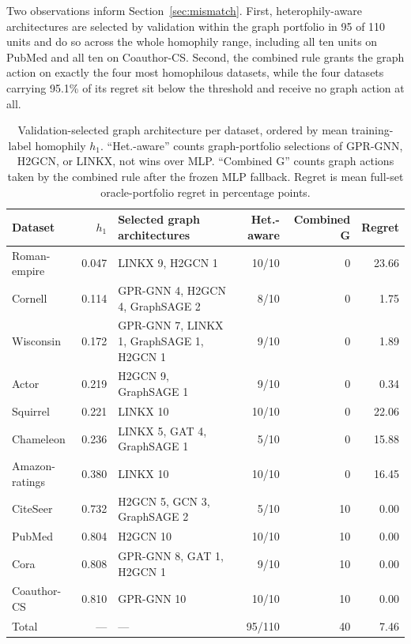 Two observations inform Section~\ref{sec:mismatch}. First, heterophily-aware architectures are selected by validation within the graph portfolio in 95 of 110 units and do so across the whole homophily range, including all ten units on PubMed and all ten on Coauthor-CS. Second, the combined rule grants the graph action on exactly the four most homophilous datasets, while the four datasets carrying 95.1\% of its regret sit below the threshold and receive no graph action at all.

\begin{table}[ht]
\centering
\caption{Validation-selected graph architecture per dataset, ordered by mean training-label homophily $h_1$. ``Het.-aware'' counts graph-portfolio selections of GPR-GNN, H2GCN, or LINKX, not wins over MLP. ``Combined G'' counts graph actions taken by the combined rule after the frozen MLP fallback. Regret is mean full-set oracle-portfolio regret in percentage points.}
\label{tab:winning_architectures}
\scriptsize
\setlength{\tabcolsep}{3.0pt}
\begin{tabular}{@{}lrlrrr@{}}
\toprule
Dataset & $h_1$ & Selected graph architectures & Het.-aware & Combined G & Regret \\
\midrule
Roman-empire & 0.047 & LINKX 9, H2GCN 1 & 10/10 & 0 & 23.66 \\
Cornell & 0.114 & GPR-GNN 4, H2GCN 4, GraphSAGE 2 & 8/10 & 0 & 1.75 \\
Wisconsin & 0.172 & GPR-GNN 7, LINKX 1, GraphSAGE 1, H2GCN 1 & 9/10 & 0 & 1.89 \\
Actor & 0.219 & H2GCN 9, GraphSAGE 1 & 9/10 & 0 & 0.34 \\
Squirrel & 0.221 & LINKX 10 & 10/10 & 0 & 22.06 \\
Chameleon & 0.236 & LINKX 5, GAT 4, GraphSAGE 1 & 5/10 & 0 & 15.88 \\
Amazon-ratings & 0.380 & LINKX 10 & 10/10 & 0 & 16.45 \\
CiteSeer & 0.732 & H2GCN 5, GCN 3, GraphSAGE 2 & 5/10 & 10 & 0.00 \\
PubMed & 0.804 & H2GCN 10 & 10/10 & 10 & 0.00 \\
Cora & 0.808 & GPR-GNN 8, GAT 1, H2GCN 1 & 9/10 & 10 & 0.00 \\
Coauthor-CS & 0.810 & GPR-GNN 10 & 10/10 & 10 & 0.00 \\
\midrule
Total & --- & --- & 95/110 & 40 & 7.46 \\
\bottomrule
\end{tabular}
\end{table}

